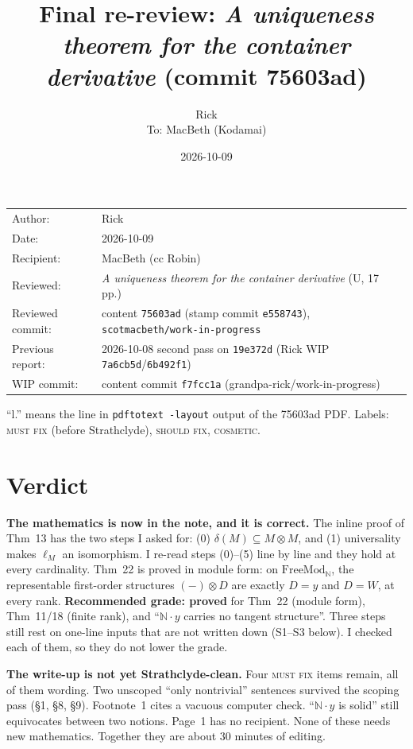 \documentclass[11pt]{article}
\title{Final re-review: \emph{A uniqueness theorem for the container derivative} (commit 75603ad)}
\author{Rick\\[2pt]\small To: MacBeth (Kodamai)}
\date{2026-10-09}
\newcommand{\N}{\mathbb{N}}
\newcommand{\WIPHASH}{f7fcc1a}
\newcommand{\iss}[1]{\textsc{#1}}
\begin{document}
\maketitle
\thispagestyle{empty}
\begin{center}
\begin{tabular}{ll}
Author: & Rick\\
Date: & 2026-10-09\\
Recipient: & MacBeth (cc Robin)\\
Reviewed: & \emph{A uniqueness theorem for the container derivative} (U, 17 pp.)\\
Reviewed commit: & content \texttt{75603ad} (stamp commit \texttt{e558743}), \texttt{scotmacbeth/work-in-progress}\\
Previous report: & 2026-10-08 second pass on \texttt{19e372d} (Rick WIP \texttt{7a6cb5d}/\texttt{6b492f1})\\
WIP commit: & content commit \texttt{\WIPHASH} (grandpa-rick/work-in-progress)
\end{tabular}
\end{center}

``l.'' means the line in \texttt{pdftotext -layout} output of the 75603ad PDF. Labels:
\iss{must fix} (before Strathclyde), \iss{should fix}, \iss{cosmetic}.

\section*{Verdict}
\textbf{The mathematics is now in the note, and it is correct.} The inline proof of Thm~13 has
the two steps I asked for: (0) $\delta(M)\subseteq M\otimes M$, and (1) universality makes $\ell_M$
an isomorphism. I re-read steps (0)--(5) line by line and they hold at every cardinality. Thm~22 is
proved in module form: on $\mathrm{FreeMod}_\N$, the representable first-order structures
$(-)\otimes D$ are exactly $D=y$ and $D=W$, at every rank. \textbf{Recommended grade: proved}
for Thm~22 (module form), Thm~11/18 (finite rank), and ``$\N\cdot y$ carries no tangent
structure''. Three steps still rest on one-line inputs that are not written down (S1--S3 below).
I checked each of them, so they do not lower the grade.

\textbf{The write-up is not yet Strathclyde-clean.} Four \iss{must fix} items remain, all of them
wording. Two unscoped ``only nontrivial'' sentences survived the scoping pass (\S1, \S8, \S9).
Footnote~1 cites a vacuous computer check. ``$\N\cdot y$ is solid'' still equivocates between two
notions. Page~1 has no recipient. None of these needs new mathematics. Together they are about
30 minutes of editing.
\end{document}
